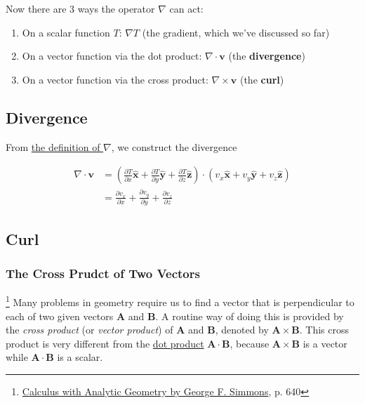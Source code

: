 Now there are 3 ways the operator $\nabla$ can act:

\begin{enumerate}
    \item On a scalar function $T$: $\nabla T$ (the gradient, which we've discussed so far)
    \item On a vector function via the dot product: $\nabla \cdot \boldsymbol{v}$ (the \textbf{divergence})
    \item On a vector function via the cross product: $\nabla \times \boldsymbol{v}$ (the \textbf{curl})
\end{enumerate}

\subsection{Divergence}

From \hyperref[eq:def-gradient]{the definition of $\nabla$}, we construct the divergence

\begin{align}
    \nabla \cdot \boldsymbol{v} &= \left( \frac{\partial T}{\partial x}\boldsymbol{\hat{x}} + \frac{\partial T}{\partial y}\boldsymbol{\hat{y}} + \frac{\partial T}{\partial z}\boldsymbol{\hat{z}} \right) \cdot (v_x\boldsymbol{\hat{x}} + v_y\boldsymbol{\hat{y}} + v_z\boldsymbol{\hat{z}}) \label{eq:divergence-dot-product} \\
    &= \frac{\partial v_x}{\partial x} + \frac{\partial v_y}{\partial y} + \frac{\partial v_z}{\partial z}
\end{align}


\subsection{Curl}

\subsubsection{The Cross Prudct of Two Vectors}

\footnote{\href{https://trello.com/c/byu9Pyy8}{Calculus with Analytic Geometry by George F. Simmons}, p. 640} Many
problems in geometry require us to find a vector that is perpendicular to each of two given vectors $\boldsymbol{A}$ and
$\boldsymbol{B}$. A routine way of doing this is provided by the \textit{cross product} (or \textit{vector product}) of
$\boldsymbol{A}$ and $\boldsymbol{B}$, denoted by $\boldsymbol{A} \times \boldsymbol{B}$. This cross product is very
different from the \hyperref[eq:divergence-dot-product]{dot product} $\boldsymbol{A} \cdot \boldsymbol{B}$, because
$\boldsymbol{A} \times \boldsymbol{B}$ is a vector while $\boldsymbol{A} \cdot \boldsymbol{B}$ is a scalar.

